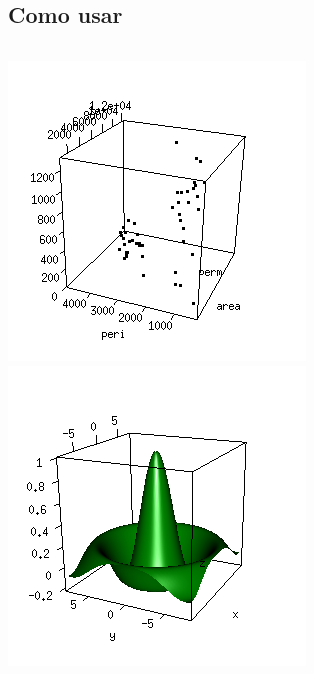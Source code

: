 \subsection{Como usar}

\begin{frame}
  \begin{columns}
    
    \includegraphics[width=\linewidth]{./images/fig3d-1.png}\\
    \includegraphics[width=\linewidth]{./images/fig3d-2.png}
  \end{columns}
\end{frame}

